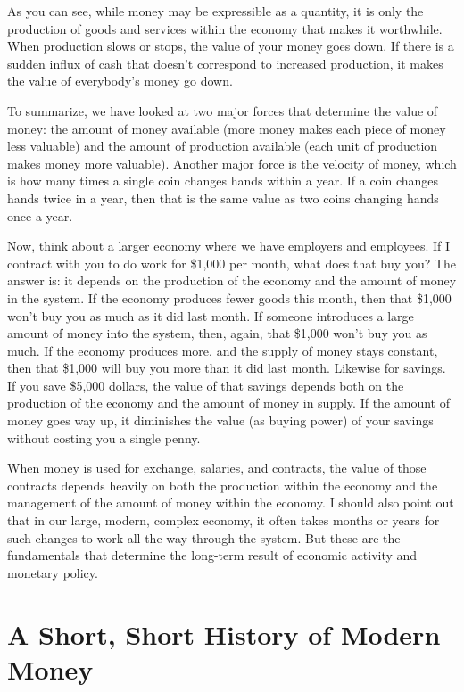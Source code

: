 As you can see, while money may be expressible as a quantity, it is only
the production of goods and services within the economy that makes it
worthwhile. When production slows or stops, the value of your money
goes down. If there is a sudden influx of cash that doesn’t correspond
to increased production, it makes the value of everybody’s money go
down. 

To summarize, we have
looked at two major forces that determine the value of money: the
amount of money available (more money makes each piece of money less
valuable) and the amount of production available (each unit of
production makes money more valuable). Another major force is the
velocity of money, which is how many times a single coin changes hands
within a year. If a coin changes hands twice in a year, then that is
the same value as two coins changing hands once a year.

Now, think about a larger economy where we have employers and employees.
If I contract with you to do work for \$1,000 per month, what does that
buy you?  The answer is: it depends on the production of the economy
and the amount of money in the system. If the economy produces fewer
goods this month, then that \$1,000 won’t buy you as much as it did
last month. If someone introduces a large amount of money into the
system, then, again, that \$1,000 won’t buy you as much. If the economy
produces more, and the supply of money stays constant, then that
\$1,000 will buy you more than it did last month. Likewise for savings.
If you save \$5,000 dollars, the value of that savings depends both on
the production of the economy and the amount of money in supply. If the
amount of money goes way up, it diminishes the value (as buying power)
of your savings without costing you a single penny.

When money is used for exchange, salaries, and contracts, the value of
those contracts depends heavily on both the production within the
economy and the management of the amount of money within the economy. I
should also point out that in our large, modern, complex economy, it
often takes months or years for such changes to work all the way
through the system. But these are the fundamentals that determine the
long-term result of economic activity and monetary policy.

\section{A Short, Short History of Modern Money}

